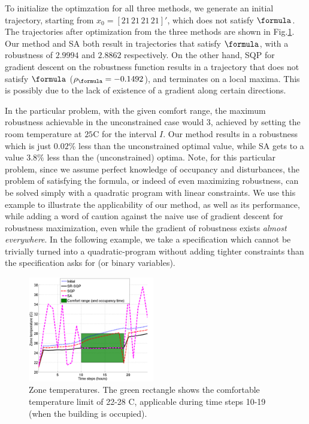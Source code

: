 To initialize the optimzation for all three methods, we generate an initial trajectory, starting from $x_0=[21 \, 21 \, 21 \, 21]'$, which does not satisfy $\formula$. The trajectories after optimization from the three methods are shown in Fig.\ref{fig:ZoneTemp}. Our method and SA both result in trajectories that satisfy $\formula$, with a robustness of $2.9994$ and $2.8862$ respectively. On the other hand, SQP for gradient descent on the robustness function results in a trajectory that does not satisfy $\formula$ ($\rob_{\formula} = -0.1492$), and terminates on a local maxima. This is possibly due to the lack of existence of a gradient along certain directions. 

In the particular problem, with the given comfort range, the maximum robustness achievable in the unconstrained case would $3$, achieved by setting the room temperature at $25$C for the interval $I$. Our method results in a robustness which is just $0.02\%$ less than the unconstrained optimal value, while SA gets to a value $3.8\%$ less than the (unconstrained) optima. Note, for this particular problem, since we assume perfect knowledge of occupancy and disturbances, the problem of satisfying the formula, or indeed of even maximizing robustness, can be solved simply with a quadratic program with linear constraints. We use this example to illustrate the applicability of our method, as well as its performance, while adding a word of caution against the naive use of gradient descent for robustness maximization, even while the gradient of robustness exists \textit{almost everywhere}. In the following example, we take a specification which cannot be trivially turned into a quadratic-program without adding tighter constraints than the specification asks for (or binary variables).


\begin{figure}[t]
\centering
\includegraphics[width=0.49\textwidth]{figures/ZoneTemp_scissored}
\caption{Zone temperatures. The green rectangle shows the comfortable temperature limit of 22-28 C, applicable during time steps 10-19 (when the building is occupied).}
\label{fig:ZoneTemp}
\end{figure}

